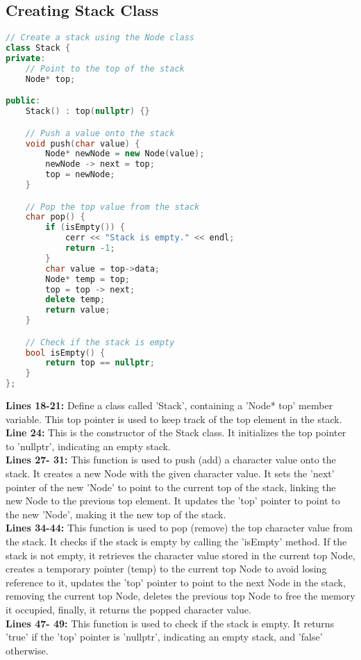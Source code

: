 \documentclass[letterpaper, 10pt,DIV=13]{scrartcl}
\numberwithin{equation}{section} %
\numberwithin{figure}{section} %
\numberwithin{table}{section} %
\begin{document}
\subsection{Creating Stack Class}
\begin{linenumbers}
\begin{lstlisting}[language=C++, caption={Stack Class}, label={code:example}]
// Create a stack using the Node class
class Stack {
private:
    // Point to the top of the stack
    Node* top;

public:
    Stack() : top(nullptr) {}

    // Push a value onto the stack
    void push(char value) {
        Node* newNode = new Node(value);
        newNode -> next = top;
        top = newNode;
    }

    // Pop the top value from the stack
    char pop() {
        if (isEmpty()) {
            cerr << "Stack is empty." << endl;
            return -1;
        }
        char value = top->data;
        Node* temp = top;
        top = top -> next;
        delete temp;
        return value;
    }

    // Check if the stack is empty
    bool isEmpty() {
        return top == nullptr;
    }
};
\end{lstlisting}
\end{linenumbers}
\nolinenumbers

\textbf{Lines 18-21:} Define a class called 'Stack', containing a 'Node* top' member variable. This top pointer is used to keep track of the top element in the stack. \\
\textbf{Line 24:} This is the constructor of the Stack class. It initializes the top pointer to 'nullptr', indicating an empty stack. \\
\textbf{Lines 27- 31:} This function is used to push (add) a character value onto the stack. It creates a new Node with the given character value. It sets the 'next' pointer of the new 'Node' to point to the current top of the stack, linking the new Node to the previous top element. It updates the 'top' pointer to point to the new 'Node', making it the new top of the stack. \\
\textbf{Lines 34-44:} This function is used to pop (remove) the top character value from the stack. It checks if the stack is empty by calling the 'isEmpty' method. If the stack is not empty, it retrieves the character value stored in the current top Node, creates a temporary pointer (temp) to the current top Node to avoid losing reference to it, updates the 'top' pointer to point to the next Node in the stack, removing the current top Node, deletes the previous top Node to free the memory it occupied, finally, it returns the popped character value. \\
\textbf{Lines 47- 49:} This function is used to check if the stack is empty. It returns 'true' if the 'top' pointer is 'nullptr', indicating an empty stack, and 'false' otherwise.
\end{document}

